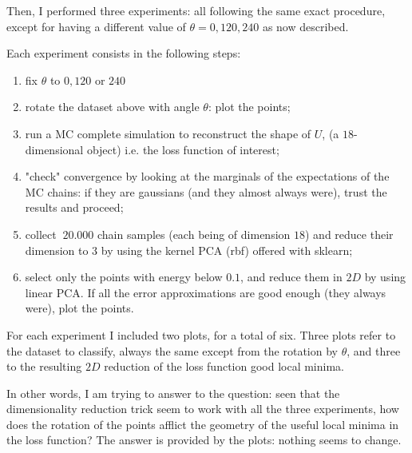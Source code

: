 \documentclass{article}
\begin{document}
Then, I performed three experiments: all following the same exact procedure,
except for having a different value of $\theta = 0, 120, 240$ as now described.


Each experiment consists in the following steps:
\begin{enumerate}
	\item fix $\theta$ to $0, 120$ or $240$
	\item rotate the dataset above with angle $\theta$: plot the points;
	\item run a MC complete simulation to reconstruct the shape of $U$,
		(a $18$-dimensional object) i.e. the loss function of interest;
	\item "check" convergence by looking at the marginals of the
		expectations of the MC chains: if they are gaussians (and
		they almost always were),
		trust the results and proceed;
	\item collect $~20.000$ chain samples (each being of dimension
		$18$) and reduce their dimension to $3$ by using
		the kernel PCA (rbf) offered with sklearn;
	\item select only the points with energy below $0.1$, and reduce them
		in $2D$ by using linear PCA. If all the error approximations
		are good enough (they always were), plot the points.
\end{enumerate}


For each experiment I included two plots, for a total of six.
Three plots refer to the dataset to classify, always the same except from the
rotation by $\theta$, and three to the resulting $2D$ reduction of the 
loss function good local minima.


In other words, I am trying to answer to the question:
seen that the dimensionality reduction trick seem to work
with all the three experiments, how does the rotation of the points
afflict the geometry of the useful local minima in the loss function?
The answer is provided by the plots: nothing seems to change.
\end{document}
